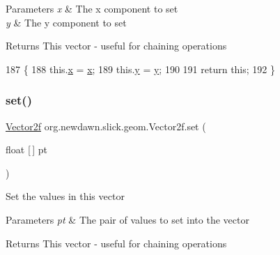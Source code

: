 \begin{DoxyParams}{Parameters}
{\em x} & The x component to set \\
\hline
{\em y} & The y component to set \\
\hline
\end{DoxyParams}
\begin{DoxyReturn}{Returns}
This vector -\/ useful for chaining operations 
\end{DoxyReturn}

\begin{DoxyCode}
187                                           \{ 
188         this.\mbox{\hyperlink{classorg_1_1newdawn_1_1slick_1_1geom_1_1_vector2f_a3c72cdf13ebc511a472e1a02002fa579}{x}} = \mbox{\hyperlink{classorg_1_1newdawn_1_1slick_1_1geom_1_1_vector2f_a3c72cdf13ebc511a472e1a02002fa579}{x}}; 
189         this.\mbox{\hyperlink{classorg_1_1newdawn_1_1slick_1_1geom_1_1_vector2f_aa03914f0c3d32063aa90e5bd7b74688e}{y}} = \mbox{\hyperlink{classorg_1_1newdawn_1_1slick_1_1geom_1_1_vector2f_aa03914f0c3d32063aa90e5bd7b74688e}{y}}; 
190         
191         \textcolor{keywordflow}{return} \textcolor{keyword}{this};
192     \}
\end{DoxyCode}
\mbox{\label{classorg_1_1newdawn_1_1slick_1_1geom_1_1_vector2f_a8dcb650bb894a27820d7c1736a4f864d}} 
\subsubsection{\texorpdfstring{set()}{set()}\hspace{0.1cm}{\footnotesize\ttfamily [3/3]}}
{\footnotesize\ttfamily \mbox{\hyperlink{classorg_1_1newdawn_1_1slick_1_1geom_1_1_vector2f}{Vector2f}} org.\+newdawn.\+slick.\+geom.\+Vector2f.\+set (\begin{DoxyParamCaption}\item[{float \mbox{[}$\,$\mbox{]}}]{pt }\end{DoxyParamCaption})\hspace{0.3cm}{\ttfamily [inline]}}

Set the values in this vector


\begin{DoxyParams}{Parameters}
{\em pt} & The pair of values to set into the vector \\
\hline
\end{DoxyParams}
\begin{DoxyReturn}{Returns}
This vector -\/ useful for chaining operations 
\end{DoxyReturn}

